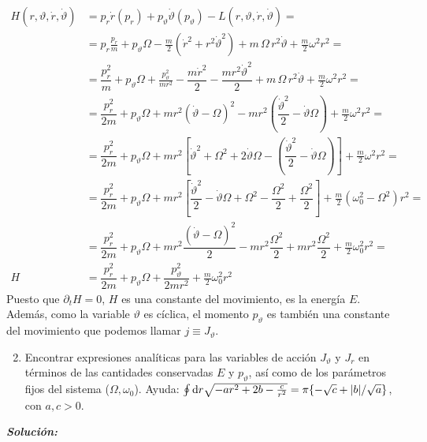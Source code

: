\documentclass{article}
\begin{document}
\begin{align*}
H(r,\vartheta,\dot{r}, \dot{\vartheta}) &=p_r\dot{r}(p_r)+p_\vartheta\dot{\vartheta}(p_\vartheta)-L(r,\vartheta,\dot{r}, \dot{\vartheta})= \\
    &=p_r\frac{p_r}{m}  +   p_\vartheta\Omega   -   \frac{m}{2} (\dot{r}^2 + r^2 \dot{\vartheta}^2) + m \, \Omega \, r^2 \dot{\vartheta} + \frac{m}{2} \omega^2 r^2 =   \\
    &=\dfrac{p_r^2}{m}+p_\vartheta\Omega+\frac{p_\vartheta^2}{mr^2}-\dfrac{m\dot{r}^2}{2}-\dfrac{mr^2\dot{\vartheta}^2}{2}+m \, \Omega \, r^2 \dot{\vartheta} + \frac{m}{2} \omega^2 r^2 =   \\
    &=  \dfrac{p_r^2}{2m}+p_\vartheta\Omega+mr^2(\dot{\vartheta}-\Omega)^2-mr^2\left(\dfrac{\dot{\vartheta}^2}{2}-\dot{\vartheta}\Omega\right)+\frac{m}{2} \omega^2 r^2=\\
    &=  \dfrac{p_r^2}{2m}+p_\vartheta\Omega+mr^2\left [ \dot{\vartheta}^2+\Omega^2+2\dot{\vartheta}\Omega-\left(\dfrac{\dot{\vartheta}^2}{2}-\dot{\vartheta}\Omega\right)      \right ]+\frac{m}{2} \omega^2 r^2=\\
    &=  \dfrac{p_r^2}{2m}+p_\vartheta\Omega+mr^2\left [ \dfrac{\dot{\vartheta}^2}{2}-\dot{\vartheta}\Omega+\Omega^2   -\dfrac{\Omega^2}{2}+\dfrac{\Omega^2}{2}      \right ]+\frac{m}{2} (\omega_0^2-\Omega^2) r^2=\\
    &=  \dfrac{p_r^2}{2m}+p_\vartheta\Omega+mr^2\dfrac{(\dot{\vartheta}-\Omega)^2}{2}-mr^2\dfrac{\Omega^2}{2}+mr^2\dfrac{\Omega^2}{2}+\frac{m}{2} \omega_0^2 r^2 =\\
    H&=  \dfrac{p_r^2}{2m}+p_\vartheta\Omega+\dfrac{p_\vartheta^2}{2mr^2}+\frac{m}{2} \omega_0^2 r^2
\end{align*}
Puesto que $\partial_t H = 0$, $H$ es una constante del movimiento, es la energía $E$. Además, como la variable $\vartheta$ es cíclica, el momento $p_\vartheta$ es también una constante del movimiento que podemos llamar $j\equiv J_{\vartheta}$. 


\begin{mybox}
    \begin{enumerate}
    \setcounter{enumi}{1}
        \item Encontrar expresiones analíticas para las variables de acción $J_\vartheta$ y $J_r$ en términos de las cantidades conservadas $E$ y $p_\vartheta$, así como de los parámetros fijos del sistema ($\Omega,\omega_0$). Ayuda: $\oint \D{r} \sqrt{-ar^2+2b-\frac{c}{r^2}}=\pi\{-\sqrt{c}+|b|/\sqrt{a}\}$, con $a,c>0$.
    \end{enumerate}
\end{mybox}
\emph{\bfseries Solución:} \\
\end{document}
